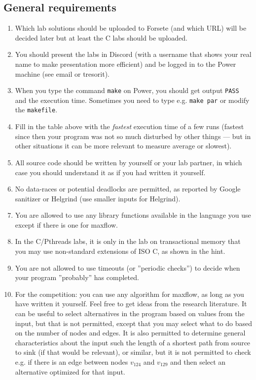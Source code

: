 \documentclass{forsete}
\begin{document}
\subsection*{General requirements}
\begin{enumerate}
\item Which lab solutions should be uploaded to Forsete (and which URL) will be decided later but at least the
C labs should be uploaded.
\item You should present the labs in Discord (with a username that shows your real name to make presentation more efficient) and be logged in to the Power machine (see email or tresorit).
\item When you type the command \verb.make. on Power, you should get output \verb.PASS. and the execution time.
Sometimes you need to type e.g. \verb.make par. or modify the \verb.makefile..
\item Fill in the table above with the {\em fastest} execution time of a few runs (fastest since then your program was not so much disturbed by other things --- but in other situations it can be more relevant to measure 
average or slowest).
\item All source code should be written by yourself or your lab partner, in which case you should understand 
it as if you had written it yourself.
\item No data-races or potential deadlocks are permitted, as reported by Google sanitizer or Helgrind (use smaller inputs for Helgrind).

\item You are allowed to use any library functions available in the language you use except if there is one for maxflow.

\item In the C/Pthreads labs, it is only in the lab on transactional memory that you may use non-standard extensions of ISO C, as shown in the hint.
\item You are not allowed to use timeouts (or ''periodic checks'') to decide when your program ''probably'' has completed.
\item For the competition: you can use any algorithm for maxflow, as long as you have written it yourself. Feel free
to get ideas from the research literature. It can be useful to select alternatives in the program based on values from the input, but that is
not permitted, except that you may select what to do based on the number of nodes and edges.
It is also permitted to
determine general characteristics about the input such the length of a shortest path from source to sink (if that would
be relevant), or similar, but it is not permitted to check e.g. if there is an edge between nodes 
$v_{124}$ and $v_{129}$ and then select  an alternative optimized for that input.

\end{enumerate}
\end{document}
